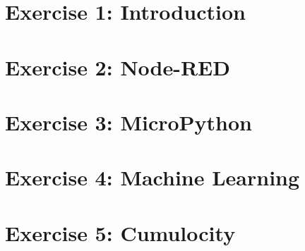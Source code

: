 




\renewcommand{\familydefault}{cmss}






\tableofcontents
\newpage
\listoffigures
\listoftables
\newpage

\printacronyms[heading=chapter*]
\newpage


\chapter{Exercise 1: Introduction}


\chapter{Exercise 2: Node-RED}


\chapter{Exercise 3: MicroPython}


\chapter{Exercise 4: Machine Learning}


\chapter{Exercise 5: Cumulocity}


